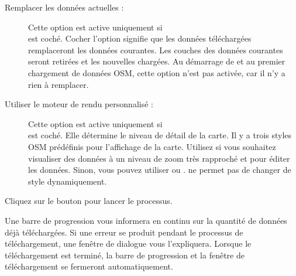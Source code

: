 \begin{description}
\item[Remplacer les données actuelles :] Cette option est active uniquement si\\  est coché. Cocher l'option signifie que les données téléchargées remplaceront les données courantes. Les couches des données courantes seront retirées et les nouvelles chargées. Au démarrage de \qg et au premier chargement de données OSM, cette option n'est pas activée, car il n'y a rien à remplacer.
\item[Utiliser le moteur de rendu personnalisé :] Cette option est active uniquement si\\  est coché. Elle détermine le niveau de détail de la carte. Il y a trois styles OSM prédéfinis pour l'affichage de la carte. Utilisez  si vous souhaitez visualiser des données à un niveau de zoom très rapproché et pour éditer les données. Sinon, vous pouvez utiliser  ou . \qg \CURRENT ne permet pas de changer de style dynamiquement.
\end{description}

Cliquez sur le bouton  pour lancer le processus.

Une barre de progression vous informera en continu sur la quantité de données déjà téléchargées. Si une erreur se produit pendant le processus de téléchargement, une fenêtre de dialogue vous l'expliquera. Lorsque le téléchargement est terminé, la barre de progression et la fenêtre de téléchargement se fermeront automatiquement.

